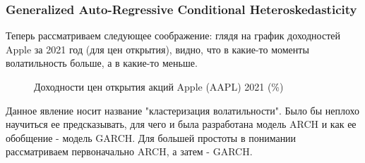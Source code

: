 \subsubsection{Generalized Auto-Regressive Conditional Heteroskedasticity}
Теперь рассматриваем следующее соображение: глядя на график доходностей Apple за 2021 год (для цен открытия), видно, что в какие-то моменты волатильность больше, а в какие-то меньше. 
\begin{figure}[H]
	\centering
	\caption{Доходности цен открытия акций Apple (AAPL) 2021 (\%)}
\end{figure}
Данное явление носит название "кластеризация волатильности". Было бы неплохо научиться ее предсказывать, для чего и была разработана модель ARCH и как ее обобщение - модель GARCH. Для большей простоты в понимании рассматриваем первоначально ARCH, а затем - GARCH.
